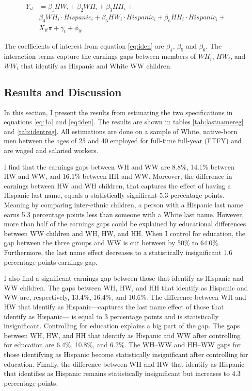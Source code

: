 \documentclass[12pt, fullpage]{article}
\begin{document}
\begin{align} \label{eq:iden}
Y_{it} &= \beta_{1} HW_{i} +  \beta_{2} WH_{i} + \beta_{3} HH_{i} +\\
& \beta_{4} WH_{i} \cdot Hispanic_{i} + \beta_{5} HW_{i}\cdot Hispanic_{i} +  \beta_{6} HH_{i} \cdot Hispanic_{i}+ \nonumber \\
&X_{it} \pi + \gamma_{t}+\phi_{it} \nonumber
\end{align}

The coefficients of interest from equation \ref{eq:iden} are $\beta_{4}$, $\beta_{5}$ and $\beta_{6}$. The interaction terms capture the earnings gaps between members of $WH_{i}$, $HW_{i}$, and $WW_{i}$ that identify as Hispanic and White WW children. 


\subsection{Results and Discussion}\label{sec:results}

In this section, I present the results from estimating the two specifications in equations \ref{eq:1a} and \ref{eq:iden}. The results are shown in tables \ref{tab:lastnamereg} and \ref{tab:identreg}. All estimations are done on a sample of White, native-born men between the ages of 25 and 40 employed for full-time full-year (FTFY) and are waged and salaried workers.

I find that the earnings gaps between WH and WW are 8.8\%, 14.1\% between HW and WW, and 16.1\% between HH and WW. Moreover, the difference in earnings between HW and WH children, that captures the effect of having a Hispanic last name, equals a statistically significant 5.3 percentage points. Meaning by comparing inter-ethnic children, a person with a Hispanic last name earns 5.3 percentage points less than someone with a White last name. However, more than half of the earnings gaps could be explained by educational differences between WW children and WH, HW, and HH. When I control for education, the gap between the three groups and WW is cut between by 50\% to 64.0\%. Furthermore, the last name effect decreases to a statistically insignificant 1.6 percentage points earnings gap.

I also find a significant earnings gap between those that identify as Hispanic and WW children. The gaps between WH, HW, and HH that identify as Hispanic and WW are, respectively, 13.4\%, 16.4\%, and 10.6\%. The difference between WH and HW that identify as Hispanic---captures the last name effect of those that identify as Hispanic--- is equal to 3 percentage points and is statistically insignificant. Controlling for education explains a big part of the gap. The gaps between WH, HW, and HH that identify as Hispanic and WW after controlling for education are 6.4\%, 10.8\%, and 6.2\%. The WH--WW and HH--WW gaps for those identifying as Hispanic become statistically insignificant after controlling for education. Finally, the difference between WH and HW that identify as Hispanic that identifies as Hispanic remains statistically insignificant but increases to 4.3 percentage points.
\end{document}
